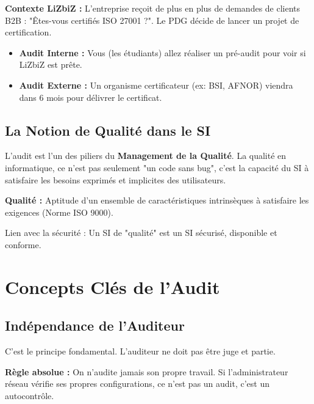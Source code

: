 \begin{boxlizbiz}
\textbf{Contexte LiZbiZ :}
L'entreprise reçoit de plus en plus de demandes de clients B2B : "Êtes-vous certifiés ISO 27001 ?". Le PDG décide de lancer un projet de certification.
\begin{itemize}
    \item \textbf{Audit Interne :} Vous (les étudiants) allez réaliser un pré-audit pour voir si LiZbiZ est prête.
    \item \textbf{Audit Externe :} Un organisme certificateur (ex: BSI, AFNOR) viendra dans 6 mois pour délivrer le certificat.
\end{itemize}
\end{boxlizbiz}

\subsection{La Notion de Qualité dans le SI}

L'audit est l'un des piliers du \textbf{Management de la Qualité}. La qualité en informatique, ce n'est pas seulement "un code sans bug", c'est la capacité du SI à satisfaire les besoins exprimés et implicites des utilisateurs.

\begin{boxdef}
\textbf{Qualité :} Aptitude d'un ensemble de caractéristiques intrinsèques à satisfaire les exigences (Norme ISO 9000).
\end{boxdef}

Lien avec la sécurité : Un SI de "qualité" est un SI sécurisé, disponible et conforme.

\section{Concepts Clés de l'Audit}

\subsection{Indépendance de l'Auditeur}

C'est le principe fondamental. L'auditeur ne doit pas être juge et partie.

\begin{boxalert}
\textbf{Règle absolue :} On n'audite jamais son propre travail. Si l'administrateur réseau vérifie ses propres configurations, ce n'est pas un audit, c'est un autocontrôle.
\end{boxalert}

